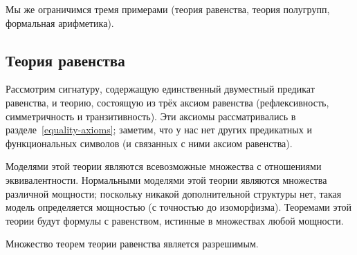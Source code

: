 Мы же ограничимся тремя примерами (теория равенства, теория
полугрупп, формальная арифметика).

\subsection*{Теория равенства}

Рассмотрим сигнатуру, содержащую единственный двуместный
предикат равенства, и теорию, состоящую из трёх аксиом равенства
(рефлексивность, симметричность и транзитивность). Эти аксиомы
рассматривались в разделе~\ref{equality-axioms}; заметим, что у
нас нет других предикатных и функциональных символов (и
связанных с ними аксиом равенства).

Моделями этой теории являются всевозможные множества с
отношениями эквивалентности. Нормальными моделями этой теории
являются множества различной мощности; поскольку никакой
дополнительной структуры нет, такая модель определяется
мощностью (с точностью до изоморфизма). Теоремами этой теории
будут формулы с равенством, истинные в множествах любой
мощности.

\begin{theorem}
        \label{equality-decidable}%
Множество теорем теории равенства яв\-ля\-ет\-ся разрешимым.
\end{theorem}

